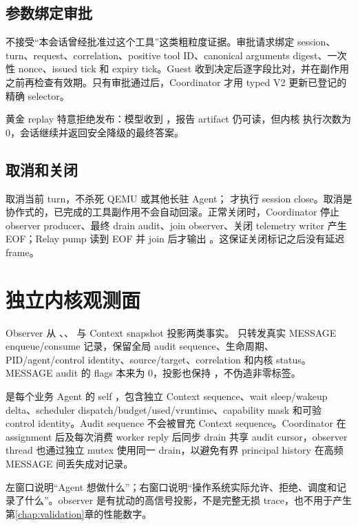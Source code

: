\subsection{参数绑定审批}

 不接受“本会话曾经批准过这个工具”这类粗粒度证据。审批请求绑定 session、turn、request、correlation、positive tool ID、canonical arguments digest、一次性 nonce、issued tick 和 expiry tick。Guest 收到决定后逐字段比对，并在副作用之前再检查有效期。只有审批通过后，Coordinator 才用 typed V2  更新已登记的精确 selector。

黄金 replay 特意拒绝发布：模型收到 ，报告 artifact 仍可读，但内核  执行次数为 0，会话继续并返回安全降级的最终答案。

\subsection{取消和关闭}

 取消当前 turn，不杀死 QEMU 或其他长驻 Agent； 才执行 session close。取消是协作式的，已完成的工具副作用不会自动回滚。正常关闭时，Coordinator 停止 observer producer、最终 drain audit、join observer、关闭 telemetry writer 产生 EOF；Relay pump 读到 EOF 并 join 后才输出 。这保证关闭标记之后没有延迟 frame。

\section{独立内核观测面}

Observer 从 、、 与 Context snapshot 投影两类事实。 只转发真实 MESSAGE enqueue/consume 记录，保留全局 audit sequence、生命周期、PID/agent/control identity、source/target、correlation 和内核 status。MESSAGE audit 的 flags 本来为 0，投影也保持 ，不伪造非零标签。

 是每个业务 Agent 的 self ，包含独立 Context sequence、wait sleep/wakeup delta、scheduler dispatch/budget/used/vruntime、capability mask 和可验 control identity。Audit sequence 不会被冒充 Context sequence。Coordinator 在 assignment 后及每次消费 worker reply 后同步 drain 共享 audit cursor，observer thread 也通过独立 mutex 使用同一 drain，以避免有界 principal history 在高频 MESSAGE 间丢失成对记录。

\begin{evidencebox}[产品解释]
左窗口说明“Agent 想做什么”；右窗口说明“操作系统实际允许、拒绝、调度和记录了什么”。observer 是有扰动的高信号投影，不是完整无损 trace，也不用于产生第\ref{chap:validation}章的性能数字。
\end{evidencebox}


